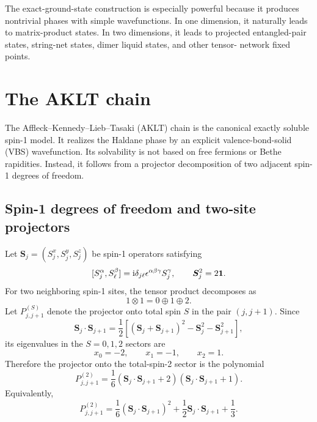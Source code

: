 The exact-ground-state construction is especially powerful because it produces
nontrivial phases with simple wavefunctions.  In one dimension, it naturally
leads to matrix-product states.  In two dimensions, it leads to projected
entangled-pair states, string-net states, dimer liquid states, and other tensor-
network fixed points.

\section{The AKLT chain}
\label{sec:aklt-chain}

The Affleck--Kennedy--Lieb--Tasaki (AKLT) chain is the canonical exactly soluble
spin-1 model.  It realizes the Haldane phase by an explicit valence-bond-solid
(VBS) wavefunction.  Its solvability is not based on free fermions or Bethe
rapidities.  Instead, it follows from a projector decomposition of two adjacent
spin-1 degrees of freedom.

\subsection{Spin-1 degrees of freedom and two-site projectors}
\label{subsec:aklt-two-site-projectors}

Let \(\bm S_j=(S_j^x,S_j^y,S_j^z)\) be spin-1 operators satisfying
\begin{equation}
\label{eq:spin-one-algebra}
    [S_j^\alpha,S_\ell^\beta]
    =
    \mathrm{i}\delta_{j\ell}\epsilon^{\alpha\beta\gamma}S_j^\gamma,
    \qquad
    \bm S_j^2=2\mathbf{1} .
\end{equation}
For two neighboring spin-1 sites, the tensor product decomposes as
\begin{equation}
\label{eq:spin-one-two-site-decomposition}
    1\otimes1 = 0\oplus1\oplus2 .
\end{equation}
Let \(P_{j,j+1}^{(S)}\) denote the projector onto total spin \(S\) in the pair
\((j,j+1)\).  Since
\begin{equation}
\label{eq:spin-dot-eigenvalues-spin-one}
    \bm S_j\cdot\bm S_{j+1}
    =
    \frac12
    \left[
        (\bm S_j+\bm S_{j+1})^2
        -\bm S_j^2
        -\bm S_{j+1}^2
    \right],
\end{equation}
its eigenvalues in the \(S=0,1,2\) sectors are
\begin{equation}
\label{eq:spin-one-dot-eigenvalues}
    x_0=-2,
    \qquad
    x_1=-1,
    \qquad
    x_2=1 .
\end{equation}
Therefore the projector onto the total-spin-2 sector is the polynomial
\begin{equation}
\label{eq:spin-two-projector-polynomial}
    P_{j,j+1}^{(2)}
    =
    \frac{1}{6}
    \left(
        \bm S_j\cdot\bm S_{j+1}+2
    \right)
    \left(
        \bm S_j\cdot\bm S_{j+1}+1
    \right).
\end{equation}
Equivalently,
\begin{equation}
\label{eq:spin-two-projector-expanded}
    P_{j,j+1}^{(2)}
    =
    \frac16(\bm S_j\cdot\bm S_{j+1})^2
    +\frac12\bm S_j\cdot\bm S_{j+1}
    +\frac13 .
\end{equation}

